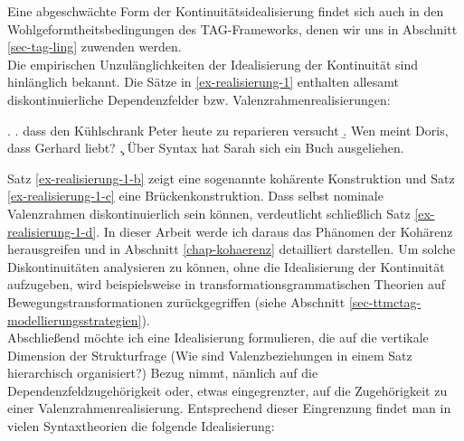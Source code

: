 Eine abgeschwächte Form der Kontinuitätsidealisierung findet sich auch in den Wohlgeformtheitsbedingungen des TAG-Frameworks, denen wir uns in Abschnitt \ref{sec-tag-ling} zuwenden werden. \\

Die empirischen Unzulänglichkeiten der Idealisierung der Kontinuität sind hinlänglich bekannt. Die Sätze in \ref{ex-realisierung-1} enthalten allesamt diskontinuierliche Dependenzfelder bzw. Valenzrahmenrealisierungen:

\ex. \label{ex-realisierung-1}
\a. \label{ex-realisierung-1-b} dass den Kühlschrank Peter heute zu reparieren versucht
\b. \label{ex-realisierung-1-c} Wen meint Doris, dass Gerhard liebt? \hfill \cite[(2c)]{Featherston:05}
\c. \label{ex-realisierung-1-d} Über Syntax hat Sarah sich ein Buch ausgeliehen. \\ \cite[(1)]{DeKuthy:02}  

Satz \ref{ex-realisierung-1-b} zeigt eine sogenannte kohärente Konstruktion und Satz \ref{ex-realisierung-1-c} eine Brückenkonstruktion. Dass selbst nominale Valenzrahmen diskontinuierlich sein können, verdeutlicht schließlich Satz \ref{ex-realisierung-1-d}. In dieser Arbeit werde ich daraus das Phänomen der Kohärenz herausgreifen und in Abschnitt \ref{chap-kohaerenz} detailliert darstellen. Um solche Diskontinuitäten analysieren zu können, ohne die Idealisierung der Kontinuität aufzugeben, wird beispielsweise in transformationsgrammatischen Theorien auf Bewegungstransformationen zurückgegriffen (siehe Abschnitt \ref{sec-ttmctag-modellierungsstrategien}). \\


Abschlie\ss end möchte ich eine Idealisierung formulieren, die auf die vertikale Dimension der Strukturfrage (Wie sind Valenzbeziehungen in einem Satz hierarchisch organisiert?) Bezug nimmt, nämlich auf die Dependenzfeldzugehörigkeit oder, etwas eingegrenzter, auf die Zugehörigkeit zu einer Valenzrahmenrealisierung. Entsprechend dieser Eingrenzung findet man in vielen Syntaxtheorien die folgende Idealisierung: 

